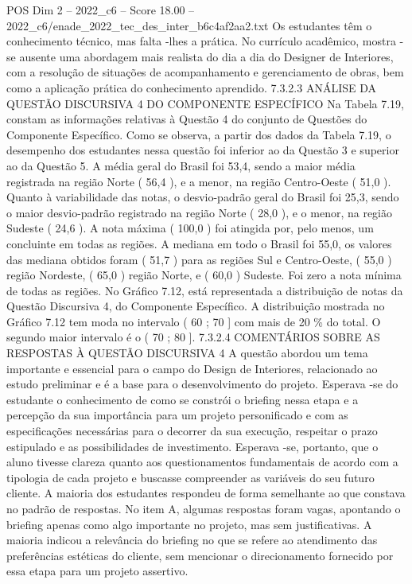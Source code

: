 \begin{textsample}{POS Dim 2 – 2022\_c6 – Score 18.00 – 2022\_c6/enade\_2022\_tec\_des\_inter\_b6c4af2aa2.txt}
Os estudantes têm o conhecimento técnico, mas falta -lhes a prática.
No currículo acadêmico, mostra -se ausente uma abordagem mais realista do dia a dia do Designer de Interiores, com a resolução de situações de acompanhamento e gerenciamento de obras, bem como a aplicação prática do conhecimento aprendido. 7.3.2.3 ANÁLISE DA QUESTÃO DISCURSIVA 4 DO COMPONENTE ESPECÍFICO Na Tabela 7.19, constam as informações relativas à Questão 4 do conjunto de Questões do Componente Específico.
Como se observa, a partir dos dados da Tabela 7.19, o desempenho dos estudantes nessa questão foi inferior ao da Questão 3 e superior ao da Questão 5.
A média geral do Brasil foi 53,4, sendo a maior média registrada na região Norte ( 56,4 ), e a menor, na região Centro-Oeste ( 51,0 ).
Quanto à variabilidade das notas, o desvio-padrão geral do Brasil foi 25,3, sendo o maior desvio-padrão registrado na região Norte ( 28,0 ), e o menor, na região Sudeste ( 24,6 ).
A nota máxima ( 100,0 ) foi atingida por, pelo menos, um concluinte em todas as regiões.
A mediana em todo o Brasil foi 55,0, os valores das mediana obtidos foram ( 51,7 ) para as regiões Sul e Centro-Oeste, ( 55,0 ) região Nordeste, ( 65,0 ) região Norte, e ( 60,0 ) Sudeste.
Foi zero a nota mínima de todas as regiões.
No Gráfico 7.12, está representada a distribuição de notas da Questão Discursiva 4, do Componente Específico.
A distribuição mostrada no Gráfico 7.12 tem moda no intervalo ( 60 ; 70 ] com mais de 20 \% do total.
O segundo maior intervalo é o ( 70 ; 80 ]. 7.3.2.4 COMENTÁRIOS SOBRE AS RESPOSTAS À QUESTÃO DISCURSIVA 4 A questão abordou um tema importante e essencial para o campo do Design de Interiores, relacionado ao estudo preliminar e é a base para o desenvolvimento do projeto.
Esperava -se do estudante o conhecimento de como se constrói o briefing nessa etapa e a percepção da sua importância para um projeto personificado e com as especificações necessárias para o decorrer da sua execução, respeitar o prazo estipulado e as possibilidades de investimento.
Esperava -se, portanto, que o aluno tivesse clareza quanto aos questionamentos fundamentais de acordo com a tipologia de cada projeto e buscasse compreender as variáveis do seu futuro cliente.
A maioria dos estudantes respondeu de forma semelhante ao que constava no padrão de respostas.
No item A, algumas respostas foram vagas, apontando o briefing apenas como algo importante no projeto, mas sem justificativas.
A maioria indicou a relevância do briefing no que se refere ao atendimento das preferências estéticas do cliente, sem mencionar o direcionamento fornecido por essa etapa para um projeto assertivo.

\end{textsample}
